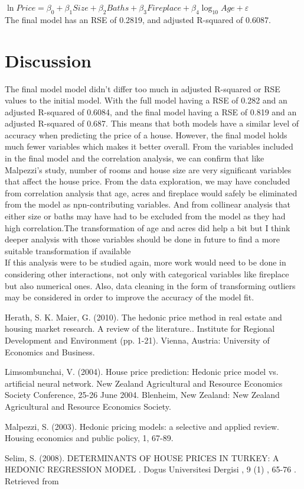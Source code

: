 \documentclass[10pt,A4,makeidx]{article}
\begin{document}
  \(\ln Price = \beta _0 + \beta _1 Size + \beta _2 Baths + \beta _3 Fireplace + \beta _4 \log_{10}Age + \varepsilon\)\\
  
  The final model has an RSE of 0.2819, and adjusted R-squared of 0.6087.\\

\section{Discussion}
  The final model model didn’t differ too much in adjusted R-squared or RSE values 
  to the initial model. With the full model having a RSE of 0.282 and an adjusted 
  R-squared of 0.6084, and the final model having a RSE of 0.819 and an adjusted 
  R-squared of 0.687. This means that both models have a similar level of accuracy 
  when predicting the price of a house. However, the final model holds much fewer 
  variables which makes it better overall. From the variables included in the final
  model and the correlation analysis, we can confirm that like Malpezzi’s study, 
  number of rooms and house size are very significant variables that affect the 
  house price. From the data exploration, we may have concluded from correlation 
  analysis that age, acres and fireplace would safely be eliminated from the model 
  as npn-contributing variables. And from collinear analysis that either size or 
  baths may have had to be excluded from the model as they had high correlation.The 
  transformation of age and acres did help a bit but I think deeper analysis with 
  those variables should be done in future to find a more suitable transformation 
  if available\\

  If this analysis were to be studied again, more work would need to be done in 
  considering other interactions, not only with categorical variables like fireplace 
  but also numerical ones. Also, data cleaning in the form of transforming outliers 
  may be considered in order to improve the accuracy of the model fit.



\begin{thebibliography}{9}
Herath, S. K. Maier, G. (2010). The hedonic price method in real estate and housing market research. A review of the literature.. Institute for Regional Development and Environment (pp. 1-21). Vienna, Austria: University of Economics and Business.

Limsombunchai, V. (2004). House price prediction: Hedonic price model vs. artificial neural network. New Zealand Agricultural and Resource Economics Society Conference, 25-26 June 2004. Blenheim, New Zealand: New Zealand Agricultural and Resource Economics Society.

Malpezzi, S. (2003). Hedonic pricing models: a selective and applied review. Housing economics and public policy, 1, 67-89.

Selim, S. (2008). DETERMINANTS OF HOUSE PRICES IN TURKEY: A HEDONIC REGRESSION MODEL . Dogus Universitesi Dergisi , 9 (1) , 65-76 . Retrieved from 
\end{thebibliography}
\end{document}
